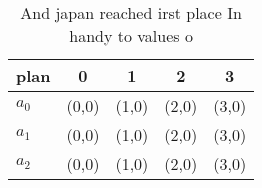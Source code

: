 \documentclass[a4paper]{article}
\begin{document}
\begin{table}
\begin{adjustbox}{width=0.8\columnwidth}
\begin{tabular}{|l|l|l|l|l|}
\hline
\textbf{plan} & \multicolumn{1}{c|}{\textbf{0}} & \multicolumn{1}{c|}{\textbf{1}} & \multicolumn{1}{c|}{\textbf{2}} & \multicolumn{1}{c|}{\textbf{3}} \\ \hline
\textbf{$a_0$}  & (0,0) & (1,0) & (2,0) & (3,0) \\ \hline
\textbf{$a_1$}  & (0,0) & (1,0) & (2,0) & (3,0) \\ \hline
\textbf{$a_2$}  & (0,0) & (1,0) & (2,0) & (3,0) \\ \hline
\end{tabular}
\end{adjustbox}
\caption{And japan reached irst place In handy to values o
}
\end{table}
\end{document}
